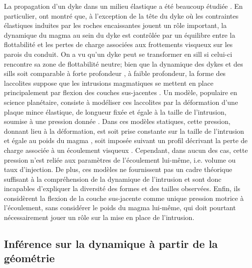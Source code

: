 La  propagation d'un  dyke dans  un  milieu élastique  a été  beaucoup
étudiée    \citep{Lister:1991ut,Rubin:1995upa}.     En    particulier,
\citet{Lister:1991ut} ont montré que, à l'exception de la tête du dyke
où  les contraintes  élastiques induites  par les  roches encaissantes
jouent un  rôle important, la dynamique  du magma au sein  du dyke est
contrôlée  par un  équilibre entre  la flottabilité  et les  pertes de
charge associées aux  frottements visqueux sur les  parois du conduit.
On a vu  qu'un dyke peut se transformer en  sill si celui-ci rencontre
sa zone de flottabilité neutre; bien que la dynamique des dykes et des
sills       soit       comparable       à       forte       profondeur
\citep{Lister:1991ut,Cruden:tg},  à faible  profondeur,  la forme  des
laccolites suppose que les intrusions  magmatiques se mettent en place
principalement     par     flexion    des     couches     sus-jacentes
\citep{Johnson:1973ho}.  Un  modèle, populaire en  science planétaire,
consiste à  modéliser ces laccolites  par la déformation  d'une plaque
mince  élastique,  de   longueur  fixée  et  égale  à   la  taille  de
l'intrusion,  soumise à  une  pression donnée  \citep{Pollard:1973ho}.
Dans  ces  modèles  statiques,  cette  pression,  donnant  lieu  à  la
déformation, est soit prise constante  sur la taille de l'intrusion et
égale             au             poids            du             magma
\citep{Pollard:1973ho,Wichman:1996bj,Jozwiak:2012dq},   soit   imposée
suivant  un  profil  décrivant  la  perte  de  charge  associée  à  un
écoulement visqueux \citep{Kerr:1998eo,Wohler:2009jj}. Cependant, dans
aucun  des  cas,  cette  pression   n’est  reliée  aux  paramètres  de
l’écoulement lui-même, i.e. volume ou  taux d’injection.  De plus, ces
modèles  ne  fournissent  pas  un   cadre  théorique  suffisant  à  la
compréhension de la  dynamique de l'intrusion et  sont donc incapables
d'expliquer la diversité  des formes et des  tailles observées. Enfin,
ils  considèrent la  flexion  de la  couche  sus-jacente comme  unique
pression motrice  à l'écoulement,  sans considérer  le poids  du magma
lui-même, qui doit  pourtant nécessairement jouer un rôle  sur la mise
en place de l'intrusion.

\subsection{Inférence sur la dynamique à partir de la géométrie}

\label{C1-sec:empl-dynam-des}

